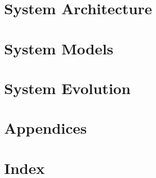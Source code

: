 \documentclass[letterpaper]{article}
\begin{document}
\section{System Architecture}
\lipsum

\section{System Models}
\lipsum

\section{System Evolution}
\lipsum

\section{Appendices}
\lipsum

\section{Index}
\lipsum
\end{document}
